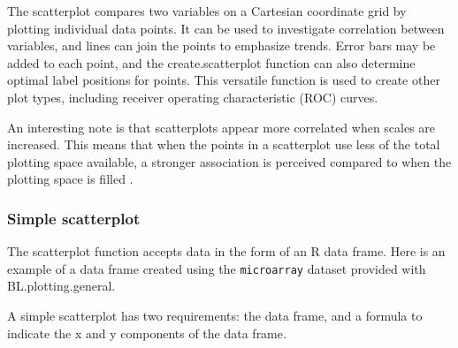 \documentclass[letterpaper]{article}\usepackage[]{graphicx}\usepackage[]{color}
\begin{document}
The scatterplot compares two variables on a Cartesian coordinate grid by plotting individual data points. It can be used to investigate correlation between variables, and lines can join the points to emphasize trends. Error bars may be added to each point, and the create.scatterplot function can also determine optimal label positions for points. This versatile function is used to create other plot types, including receiver operating characteristic (ROC) curves.

An interesting note is that scatterplots appear more correlated when scales are increased. This means that when the points in a scatterplot use less of the total plotting space available, a stronger association is perceived compared to when the plotting space is filled \cite{cleveland-scatter}.

\subsubsection{Simple scatterplot}
The scatterplot function accepts data in the form of an R  data frame. Here is an example of a data frame created using the \verb|microarray| dataset provided with BL.plotting.general.

A simple scatterplot has two requirements: the data frame, and a formula to indicate the x and y components of the data frame.

\end{document}
